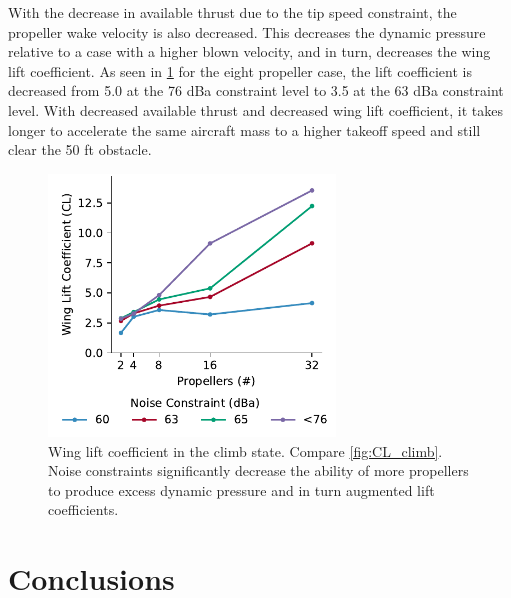 \documentclass[conf]{new-aiaa}
\begin{document}
With the decrease in available thrust due to the tip speed constraint, the propeller wake velocity is also decreased. This decreases the dynamic pressure relative to a case with a higher blown velocity, and in turn, decreases the wing lift coefficient. As seen in \cref{fig:CL_TO_db} for the eight propeller case, the lift coefficient is decreased from 5.0 at the 76 dBa constraint level to 3.5 at the 63 dBa constraint level. With decreased available thrust and decreased wing lift coefficient, it takes longer to accelerate the same aircraft mass to a higher takeoff speed and still clear the 50 ft obstacle.

\vspace{11pt}

\begin{figure}[htbp]
    \centering
    \includegraphics[trim={0.3cm 0.25cm 0.0cm 0.25cm},clip,width=3.0in]{CL_climb_db}
    \caption{Wing lift coefficient in the climb state.  Compare \cref{fig:CL_climb}. Noise constraints significantly decrease the ability of more propellers to produce excess dynamic pressure and in turn augmented lift coefficients.}
    \label{fig:CL_TO_db}
\end{figure}



\section{Conclusions}

\label{Conclusions}
\end{document}
